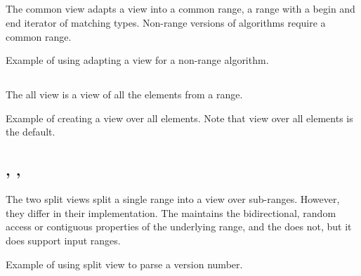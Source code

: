 \subsection{\texorpdfstring{}{\texttt{std::views::common}}}

The common view adapts a view into a common range, a range with a begin and end iterator of matching types. Non-range versions of algorithms require a common range.

\begin{box-note}
\footnotesize Example of using adapting a view for a non-range algorithm.
\tcblower
{}
\end{box-note}

\subsection{\texorpdfstring{}{\texttt{std::views::all}}}

The all view is a view of all the elements from a range.

\begin{box-note}
\footnotesize Example of creating a view over all elements. Note that view over all elements is the default.
\tcblower
{}
\end{box-note}

\subsection{\texorpdfstring{, , }{\texttt{std::views::split}, \texttt{std::views::lazy\_split}, \texttt{std::views::join\_view}}}

The two split views split a single range into a view over sub-ranges. However, they differ in their implementation.
The  maintains the bidirectional, random access or contiguous properties of the underlying range, and the  does not, but it does support input ranges.

\begin{box-note}
\footnotesize Example of using split view to parse a version number.
\tcblower
{}
\end{box-note}

